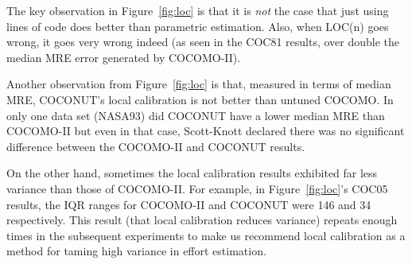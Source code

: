 \documentclass{sig-alternate}
\newcommand{\fig}[1]{Figure~\ref{fig:#1}}
\begin{document}
The key observation in \fig{loc}
is that it is {\em not} the case that just using lines of
code does better than parametric estimation.
Also, when LOC(n) goes wrong, it goes very
wrong indeed (as seen in the COC81 results, over
double the median MRE error generated by COCOMO-II).

Another observation from \fig{loc} is that,
measured in terms of median MRE, COCONUT's local
calibration is not  better
than  untuned COCOMO. In only one data set
(NASA93) did COCONUT have a lower median MRE than
COCOMO-II but even in that case, Scott-Knott
declared there was no significant difference between
the COCOMO-II and COCONUT results.

On the other hand, sometimes the local calibration
results exhibited far less variance than those of
COCOMO-II. For example, in \fig{loc}'s COC05
results, the IQR ranges for
COCOMO-II and COCONUT were 146 and 34 respectively.
This result (that local calibration reduces
variance) repeats enough times in the subsequent
experiments to make us recommend local calibration
as a method for taming high variance in effort
estimation.
\end{document}
